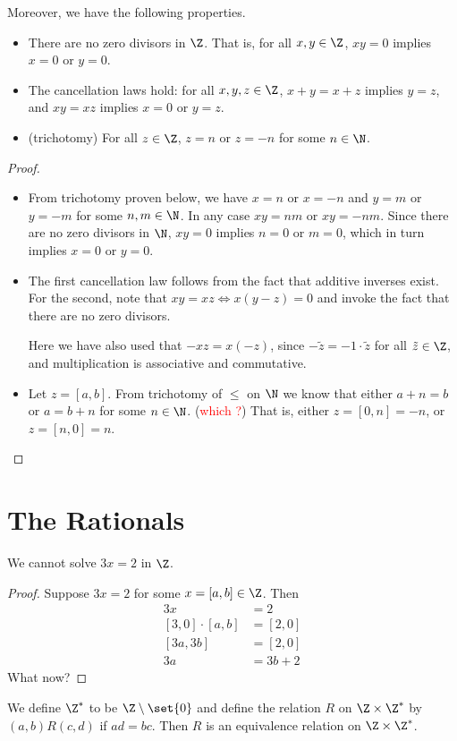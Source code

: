 Moreover, we have the following properties.
\begin{proposition} \label{thm:Z:prop} \leavevmode
    \begin{itemize}
        \item There are no zero divisors in $\Z$.
        That is, for all $x, y \in \Z$, $xy = 0$ implies $x = 0$ or $y = 0$.
        \item The cancellation laws hold:
        for all $x, y, z \in \Z$, $x + y = x + z$ implies $y = z$,
        and $xy = xz$ implies $x = 0$ or $y = z$.
        \item (trichotomy) For all $z \in \Z$, $z = n$ or $z = -n$ for some
        $n \in \N$.
    \end{itemize}
\end{proposition}
\begin{proof}
    \begin{itemize}
        \item From trichotomy proven below, we have $x = n$ or $x = -n$ and
        $y = m$ or $y = -m$ for some $n, m \in \N$.
        In any case $xy = nm$ or $xy = -nm$.
        Since there are no zero divisors in $\N$, $xy = 0$ implies $n = 0$ or
        $m = 0$, which in turn implies $x = 0$ or $y = 0$.
        \item The first cancellation law follows from the fact that additive
        inverses exist.
        For the second, note that $xy = xz \iff x(y - z) = 0$ and invoke the
        fact that there are no zero divisors.

        Here we have also used that $-xz = x(-z)$, since
        $-\tilde{z} = -1 \cdot \tilde{z}$ for all $\tilde{z} \in \Z$, and
        multiplication is associative and commutative.
        \item Let $z = [a, b]$.
        From trichotomy of $\le$ on $\N$ we know that either $a + n = b$ or
        $a = b + n$ for some $n \in \N$. (\textcolor{Red}{which \N?})
        That is, either $z = [0, n] = -n$, or $z = [n, 0] = n$.
    \end{itemize}
\end{proof}

\section{The Rationals} \label{sec:rationals}
We cannot solve $3x = 2$ in $\Z$.
\begin{proof}
    Suppose $3x = 2$ for some $x = [a, b] \in \Z$.
    Then \begin{align*}
        3x &= 2 \\
        [3, 0] \cdot [a, b] &= [2, 0] \\
        [3a, 3b] &= [2, 0] \\
        3a &= 3b + 2
    \end{align*}
    What now?
\end{proof}
We define $\Z^*$ to be $\Z \setminus \set{0}$ and define the relation $R$ on
$\Z \times \Z^*$ by $(a, b) R (c, d)$ if $ad = bc$.
Then $R$ is an equivalence relation on $\Z \times \Z^*$.


